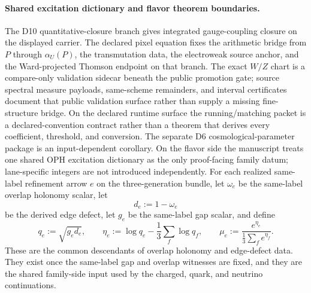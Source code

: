 \documentclass[11pt]{article}
\begin{document}
\paragraph{Shared excitation dictionary and flavor theorem boundaries.}
The D10 quantitative-closure branch gives integrated gauge-coupling closure on the displayed carrier. The declared pixel equation fixes the arithmetic bridge from \(P\) through \(\alpha_U(P)\), the transmutation data, the electroweak source anchor, and the Ward-projected Thomson endpoint on that branch. The exact \(W/Z\) chart is a compare-only validation sidecar beneath the public promotion gate; source spectral measure payloads, same-scheme remainders, and interval certificates document that public validation surface rather than supply a missing fine-structure bridge. On the declared runtime surface the running/matching packet is a declared-convention contract rather than a theorem that derives every coefficient, threshold, and conversion. The separate D6 cosmological-parameter package is an input-dependent corollary. On the flavor side the manuscript treats one shared OPH excitation dictionary as the only proof-facing family datum; lane-specific integers are not introduced independently. For each realized same-label refinement arrow \(e\) on the three-generation bundle, let \(\omega_e\) be the same-label overlap holonomy scalar, let
\[
d_e:=1-\omega_e
\]
be the derived edge defect, let \(g_e\) be the same-label gap scalar, and define
\[
q_e:=\sqrt{g_e d_e},
\qquad
\eta_e:=\log q_e-\frac13\sum_f \log q_f,
\qquad
\mu_e:=\frac{e^{\eta_e}}{\frac13\sum_f e^{\eta_f}}.
\]
These are the common descendants of overlap holonomy and edge-defect data. They exist once the same-label gap and overlap witnesses are fixed, and they are the shared family-side input used by the charged, quark, and neutrino continuations.
\end{document}
